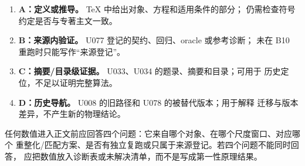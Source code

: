 \begin{enumerate}
  \item \textbf{A：定义或推导。} TeX 中给出对象、方程和适用条件的部分；
  仍需检查符号约定是否与专著主文一致。
  \item \textbf{B：来源内验证。} U077 登记的契约、回归、oracle 或参考诊断；
  未在 B10 重跑时只能写作“来源登记”。
  \item \textbf{C：摘要/目录级证据。} U033、U034 的题录、摘要和目录；可用于
  历史定位，不足以证明完整算法。
  \item \textbf{D：历史导航。} U008 的旧路径和 U078 的被替代版本；用于解释
  迁移与版本差异，不产生新的物理结论。
\end{enumerate}

任何数值进入正文前应回答四个问题：它来自哪个对象、在哪个尺度窗口、对应哪个
重整化/匹配方案、是否有独立复跑或只属于来源登记。若四个问题不能同时回答，
应把数值放入诊断表或未解决清单，而不是写成第一性原理结果。
